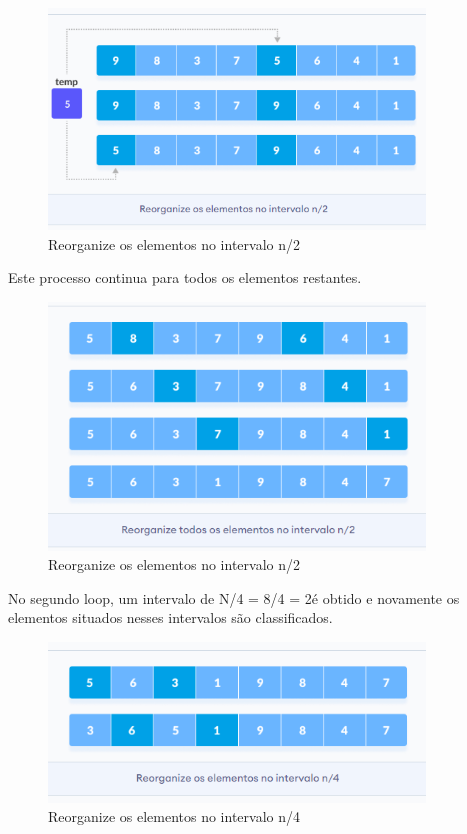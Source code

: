 \begin{figure}[h!]
    \centering
    \includegraphics[width = 10cm]{Imagens/Shell Sort/ex2.png}
    \caption{Reorganize os elementos no intervalo n/2}
    \label{fig:ex2}
\end{figure}

\par Este processo continua para todos os elementos restantes.

\begin{figure}[h!]
    \centering
    \includegraphics[width = 10cm]{Imagens/Shell Sort/ex3.png}
    \caption{Reorganize os elementos no intervalo n/2}
    \label{fig:ex3}
\end{figure}

\par No segundo loop, um intervalo de N/4 = 8/4 = 2é obtido e novamente os elementos situados nesses intervalos são classificados.

\begin{figure}[h!]
    \centering
    \includegraphics[width = 10cm]{Imagens/Shell Sort/ex4.png}
    \caption{Reorganize os elementos no intervalo n/4}
    \label{fig:ex4}
\end{figure}


